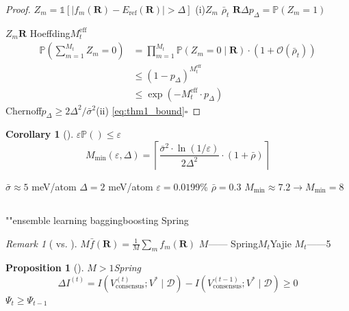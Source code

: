 \documentclass[12pt,a4paper]{article}
\newtheorem{proposition}[theorem]{Proposition}
\newtheorem{corollary}[theorem]{Corollary}
\theoremstyle{remark}
\newtheorem{remark}[theorem]{Remark}
\newcommand{\Pbb}{\mathbb{P}}
\newcommand{\D}{\mathcal{D}}
\newcommand{\Lyap}{\ensuremath{\Psi}}
\begin{document}
\begin{proof}
$Z_m = \mathbb{1}[|f_m(\mathbf{R}) - E_{\text{ref}}(\mathbf{R})| > \Delta]$
(i)$Z_m$
$\bar{\rho}_t$
$\mathbf{R}$$\Delta$$p_\Delta = \Pbb(Z_m = 1)$

$Z_m$$\mathbf{R}$
Hoeffding$M_t^{\text{eff}}$
\begin{align}
    \Pbb\left(\sum_{m=1}^{M_t} Z_m = 0\right)
    &= \prod_{m=1}^{M_t} \Pbb(Z_m = 0 \mid \mathbf{R}) \cdot (1 + \mathcal{O}(\bar{\rho}_t)) \\
    &\leq (1 - p_\Delta)^{M_t^{\text{eff}}} \\
    &\leq \exp\left(-M_t^{\text{eff}} \cdot p_\Delta\right)
\end{align}
Chernoff$p_\Delta \geq 2\Delta^2/\bar{\sigma}^2$(ii)
\eqref{eq:thm1_bound}\hfill $\square$
\end{proof}

\begin{corollary}[]\label{cor:M_required}
$\varepsilon$$\Pbb(\text{}) \leq \varepsilon$
\begin{equation}\label{eq:M_min_potential}
    M_{\min}(\varepsilon, \Delta) = \left\lceil \frac{\bar{\sigma}^2 \cdot \ln(1/\varepsilon)}{2\Delta^2} \cdot (1 + \bar{\rho}) \right\rceil
\end{equation}
\end{corollary}


$\bar{\sigma} \approx 5$ meV/atom
$\Delta = 2$ meV/atom
$\varepsilon = 0.01$99\%
$\bar{\rho} = 0.3$
$M_{\min} \approx 7.2 \to M_{\min} = 8$

\subsection{}

""ensemble learning
baggingboosting\textit{}
Spring\textbf{}\textit{}

\begin{remark}[ vs. ]
$M$$\bar{f}(\mathbf{R}) = \frac{1}{M}\sum_m f_m(\mathbf{R})$
$M$——
Spring$M_t$\textit{}Yajie
$M_t$——5
\end{remark}

\begin{proposition}[]\label{prop:info_gain}
$M>1$Spring
\begin{equation}\label{eq:info_gain}
    \Delta I^{(t)} = I(V^{(t)}_{\text{consensus}}; V^* \mid \D) - I(V^{(t-1)}_{\text{consensus}}; V^* \mid \D) \geq 0
\end{equation}
$\Lyap_t \geq \Lyap_{t-1}$
\end{proposition}
\end{document}
